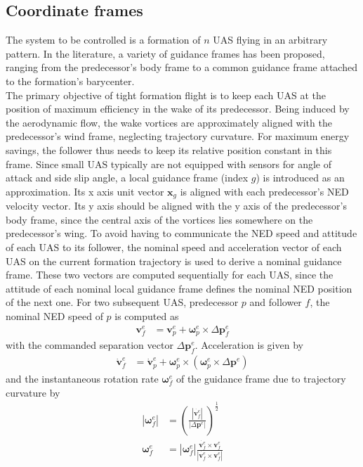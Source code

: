 \documentclass{ifacconf}
\newcommand{\mbf}[1]{\mathbf{#1}}
\providecommand{\mbf}[1]{\mathbf{#1}}
\begin{document}
\subsection{Coordinate frames}
The system to be controlled is a formation of $n$ UAS flying in an arbitrary pattern. In the literature, a variety of guidance frames has been proposed, ranging from the predecessor's body frame to a common guidance frame attached to the formation's barycenter.\\
The primary objective of tight formation flight is to keep each UAS at the position of maximum efficiency in the wake of its predecessor.
Being induced by the aerodynamic flow, the wake vortices are approximately aligned with the predecessor's wind frame, neglecting trajectory curvature. 
For maximum energy savings, the follower thus needs to keep its relative position constant in this frame. Since small UAS typically are not equipped with sensors for angle of attack and side slip angle, a local guidance frame (index $g$) is introduced as an approximation. Its x axis unit vector $\mbf{x}_g$ is aligned with each predecessor's NED velocity vector. Its y axis should be aligned with the y axis of the predecessor's body frame, since the central axis of the vortices lies somewhere on the predecessor's wing.
To avoid having to communicate the NED speed and attitude of each UAS to its follower, the nominal speed and acceleration vector of each UAS on the current formation trajectory is used to derive a nominal guidance frame.
These two vectors are computed sequentially for each UAS, since the attitude of each nominal local guidance frame defines the nominal NED position of the next one.
For two subsequent UAS, predecessor $p$ and follower $f$, the nominal NED speed of $p$ is computed as
\begin{align}
\mbf{v}_f^e &= \mbf{v}_p^e + \mbf{\omega}_p^e \times \Delta \mbf{p}_f^e 
\end{align}
with the commanded separation vector $\Delta \mbf{p}_f^e$. Acceleration is given by
\begin{align}
\dot{\mbf{v}}_f^e &= \dot{\mbf{v}}_p^e + \mbf{\omega}_p^e \times (\mbf{\omega}_p^e \times \Delta \mbf{p}^e)
\end{align}
and the instantaneous rotation rate $\mbf{\omega}_f^e$ of the guidance frame due to trajectory curvature by
\begin{align}
|\mbf{\omega}_f^e| &= \left(\frac{|\dot{\mbf{v}_f^e}|}{|\Delta \mbf{p}^e|}\right)^\frac{1}{2}\\
\mbf{\omega}_f^e &= |\mbf{\omega}_f^e| 
\frac{\dot{\mbf{v}_f^e} \times \mbf{v}_f^e}{|\dot{\mbf{v}_f^e} \times \mbf{v}_f^e|}
\end{align}
\end{document}
